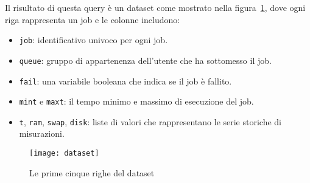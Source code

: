 Il risultato di questa query è un dataset come mostrato nella
figura~\ref{fig:dataset_from_join_hj_htjob}, dove ogni riga rappresenta un job
e le colonne includono: 

\begin{itemize}
    \item \texttt{job}: identificativo univoco per ogni job.
    \item \texttt{queue}: gruppo di appartenenza dell'utente che ha sottomesso
        il job.
    \item \texttt{fail}: una variabile booleana che indica se il job è fallito.
    \item \texttt{mint} e \texttt{maxt}: il tempo minimo e massimo di
        esecuzione del job.
    \item \texttt{t}, \texttt{ram}, \texttt{swap}, \texttt{disk}: liste di
        valori che rappresentano le serie storiche di misurazioni.
\end{itemize}




\begin{figure}[!ht]
    \centering
    \texttt{[image: dataset]}
    \caption{Le prime cinque righe del dataset}
    \label{fig:dataset_from_join_hj_htjob}
\end{figure}


